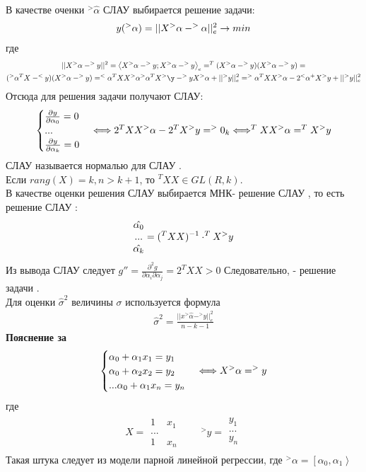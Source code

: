 \documentclass[__main__.tex]{subfiles}
\begin{document}
В качестве оченки $^>\hat{\alpha}$ СЛАУ  выбирается решение задачи:\\
\begin{gather}
\llabel{9:4}
y(^>\alpha) = || X ^>\alpha - ^>\alpha||^2_e \to min
\end{gather}
где
\begin{gather}
||X ^>\alpha - ^>y||^2 = \left<X ^>\alpha - ^>y; X ^>\alpha - ^>y\right>_e = ^T(X ^>\alpha - ^>y)(X ^>\alpha - ^>y) = \\ (^>\alpha ^TX - ^<y)(X ^>\alpha - ^>y) = ^<\alpha ^TX X ^>\alpha ^>\alpha ^TX ^>\y - ^>y X ^>\alpha + ||^>y||^2_e = ^>\alpha ^TX X ^>\alpha - 2^<\alpha ^+X ^>y + ||^>y||^2_e
\end{gather}
Отсюда для решения задачи  получают СЛАУ:
\begin{gather}
\begin{cases}
\llabel{9:5}
\frac{\partial y}{\partial \alpha_0} = 0\\
...\\
\frac{\partial y}{\partial \alpha_k} = 0
\end{cases}
\Longleftrightarrow 2 ^TX X ^>\alpha - 2 ^TX ^>y = ^>0_k \Longleftrightarrow ^TX X ^>\alpha = ^TX ^>y
\end{gather}
СЛАУ  называется нормалью для СЛАУ .\\
Если $rang(X) = k , n>k+1$, то $^TX X \in GL(R,k)$.\\
В качестве оценки решения СЛАУ  выбирается МНК- решение СЛАУ , то есть решение СЛАУ :\\
\begin{gather}
\llabel{9:7}
\begin{matrix}
\hat{\alpha_0}\\
...\\
\hat{\alpha_k}
\end{matrix}
= (^TXX)^{-1}\cdot ^TX^>y
\end{gather}
Из вывода СЛАУ  следует $g'' = \frac{\partial^2g}{\partial \alpha_i \partial \alpha_j} = 2 ^TXX>0$
Следовательно,  - решение задачи .\\
Для оценки $\hat{\sigma}^2$ величины $\sigma$ используется формула 
\begin{gather}
\hat{\sigma}^2 = \frac{||x ^>\hat{\alpha} - ^>y||^2_e}{n-k-1}
\end{gather}
\textbf{Пояснение за }
\begin{gather}
\llabel{9:10}
\begin{cases}
\alpha_0 + \alpha_1x_1 = y_1\\
\alpha_0 + \alpha_2x_2 = y_2\\
...
\alpha_0 + \alpha_1x_n = y_n
\end{cases}
\Longleftrightarrow X ^>\alpha = ^>y
\end{gather}
где 
\begin{gather}
X = \begin{matrix}
1 & x_1\\
...\\
1 & x_n
\end{matrix}
\qquad ^>y = \begin{matrix}
y_1\\
...\\
y_n\\
\end{matrix}
\end{gather}
Такая штука следует из модели парной линейной регрессии, где $^>\alpha = \left[\alpha_0,\alpha_1\right>$
\end{document}
